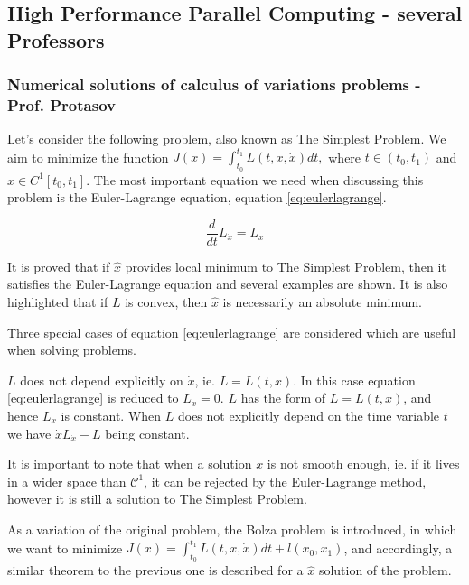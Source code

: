 \documentclass{article}
\begin{document}
\subsection{High Performance Parallel Computing - several Professors}

\subsubsection{Numerical solutions of calculus of variations problems - Prof. Protasov}
Let's consider the following problem, also known as The Simplest Problem. We aim to minimize the function $J(x) = \int_{t_0}^{t_1}L(t,x,\dot{x})dt ,$ where $t \in (t_0,t_1)$ and $x \in C^1[t_0,t_1]$. The most important equation we need when discussing this problem is the Euler-Lagrange equation, equation \ref{eq:eulerlagrange}.

\begin{equation} \label{eq:eulerlagrange}
\frac{d}{dt}L_{\dot{x}} = L_x
\end{equation}

It is proved that if $\hat{x}$ provides local minimum to The Simplest Problem, then it satisfies the Euler-Lagrange equation and several examples are shown. It is also highlighted that if $L$ is convex, then $\hat{x}$ is necessarily an absolute minimum.

Three special cases of equation \ref{eq:eulerlagrange} are considered which are useful when solving problems.

\begin{outline}[enumerate]

\1 $L$ does not depend explicitly on $\dot{x}$, ie. $L = L(t,x)$. In this case equation \ref{eq:eulerlagrange} is reduced to $L_x = 0$.
\1 $L$ has the form of $L = L(t, \dot{x})$, and hence $L_{\dot{x}}$ is constant.
\1 When $L$ does not explicitly depend on the time variable $t$ we have $\dot{x}L_{\dot{x}} - L$ being constant.

\end{outline}

It is important to note that when a solution $x$ is not smooth enough, ie. if it lives in a wider space than $\mathcal{C}^1$, it can be rejected by the Euler-Lagrange method, however it is still a solution to The Simplest Problem.

As a variation of the original problem, the Bolza problem is introduced, in which we want to minimize $J(x) = \int_{t_0}^{t_1}L(t,x,\dot{x})dt + l(x_0, x_1)$, and accordingly, a similar theorem to the previous one is described for a $\hat{x}$ solution of the problem.
\end{document}

